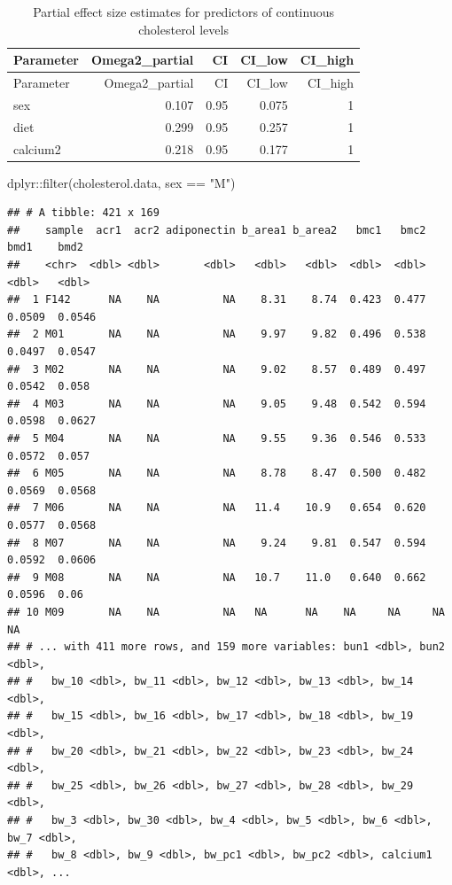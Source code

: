 \documentclass[
]{article}
\newenvironment{Shaded}{\begin{snugshade}}{\end{snugshade}}
\newcommand{\FunctionTok}[1]{\textcolor[rgb]{0.00,0.00,0.00}{#1}}
\newcommand{\NormalTok}[1]{#1}
\newcommand{\SpecialCharTok}[1]{\textcolor[rgb]{0.00,0.00,0.00}{#1}}
\newcommand{\StringTok}[1]{\textcolor[rgb]{0.31,0.60,0.02}{#1}}
\begin{document}
\begin{longtable}[]{@{}lrrrr@{}}
\caption{Partial effect size estimates for predictors of continuous
cholesterol levels}\tabularnewline
\toprule()
Parameter & Omega2\_partial & CI & CI\_low & CI\_high \\
\midrule()
\endfirsthead
\toprule()
Parameter & Omega2\_partial & CI & CI\_low & CI\_high \\
\midrule()
\endhead
sex & 0.107 & 0.95 & 0.075 & 1 \\
diet & 0.299 & 0.95 & 0.257 & 1 \\
calcium2 & 0.218 & 0.95 & 0.177 & 1 \\
\bottomrule()
\end{longtable}

\begin{Shaded}
\begin{Highlighting}[]
\NormalTok{dplyr}\SpecialCharTok{::}\FunctionTok{filter}\NormalTok{(cholesterol.data, sex }\SpecialCharTok{==} \StringTok{"M"}\NormalTok{)}
\end{Highlighting}
\end{Shaded}

\begin{verbatim}
## # A tibble: 421 x 169
##    sample  acr1  acr2 adiponectin b_area1 b_area2   bmc1   bmc2    bmd1    bmd2
##    <chr>  <dbl> <dbl>       <dbl>   <dbl>   <dbl>  <dbl>  <dbl>   <dbl>   <dbl>
##  1 F142      NA    NA          NA    8.31    8.74  0.423  0.477  0.0509  0.0546
##  2 M01       NA    NA          NA    9.97    9.82  0.496  0.538  0.0497  0.0547
##  3 M02       NA    NA          NA    9.02    8.57  0.489  0.497  0.0542  0.058 
##  4 M03       NA    NA          NA    9.05    9.48  0.542  0.594  0.0598  0.0627
##  5 M04       NA    NA          NA    9.55    9.36  0.546  0.533  0.0572  0.057 
##  6 M05       NA    NA          NA    8.78    8.47  0.500  0.482  0.0569  0.0568
##  7 M06       NA    NA          NA   11.4    10.9   0.654  0.620  0.0577  0.0568
##  8 M07       NA    NA          NA    9.24    9.81  0.547  0.594  0.0592  0.0606
##  9 M08       NA    NA          NA   10.7    11.0   0.640  0.662  0.0596  0.06  
## 10 M09       NA    NA          NA   NA      NA    NA     NA     NA      NA     
## # ... with 411 more rows, and 159 more variables: bun1 <dbl>, bun2 <dbl>,
## #   bw_10 <dbl>, bw_11 <dbl>, bw_12 <dbl>, bw_13 <dbl>, bw_14 <dbl>,
## #   bw_15 <dbl>, bw_16 <dbl>, bw_17 <dbl>, bw_18 <dbl>, bw_19 <dbl>,
## #   bw_20 <dbl>, bw_21 <dbl>, bw_22 <dbl>, bw_23 <dbl>, bw_24 <dbl>,
## #   bw_25 <dbl>, bw_26 <dbl>, bw_27 <dbl>, bw_28 <dbl>, bw_29 <dbl>,
## #   bw_3 <dbl>, bw_30 <dbl>, bw_4 <dbl>, bw_5 <dbl>, bw_6 <dbl>, bw_7 <dbl>,
## #   bw_8 <dbl>, bw_9 <dbl>, bw_pc1 <dbl>, bw_pc2 <dbl>, calcium1 <dbl>, ...
\end{verbatim}
\end{document}
